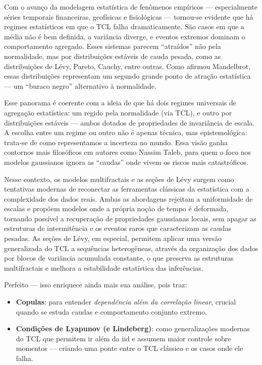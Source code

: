 \documentclass[
]{agujournal2019}
\providecommand{\tightlist}{%
  \setlength{\itemsep}{0pt}\setlength{\parskip}{0pt}}\usepackage{longtable,booktabs,array}
\begin{document}
Com o avanço da modelagem estatística de fenômenos empíricos ---
especialmente séries temporais financeiras, geofísicas e fisiológicas
--- tornou-se evidente que há regimes estatísticos em que o TCL falha
dramaticamente. São casos em que a média não é bem definida, a variância
diverge, e eventos extremos dominam o comportamento agregado. Esses
sistemas parecem ``atraídos'' não pela normalidade, mas por
distribuições estáveis de cauda pesada, como as distribuições de Lévy,
Pareto, Cauchy, entre outras. Como afirmou Mandelbrot, essas
distribuições representam um segundo grande ponto de atração estatística
--- um ``buraco negro'' alternativo à normalidade.

Esse panorama é coerente com a ideia de que há dois regimes universais
de agregação estatística: um regido pela normalidade (via TCL), e outro
por distribuições estáveis --- ambos dotados de propriedades de
invariância de escala. A escolha entre um regime ou outro não é apenas
técnica, mas epistemológica: trata-se de como representamos a incerteza
no mundo. Essa visão ganha contornos mais filosóficos em autores como
Nassim Taleb, para quem o foco nos modelos gaussianos ignora as
``caudas'' onde vivem os riscos mais catastróficos.

Nesse contexto, os modelos multifractais e as seções de Lévy surgem como
tentativas modernas de reconectar as ferramentas clássicas da
estatística com a complexidade dos dados reais. Ambas as abordagens
rejeitam a uniformidade de escalas e propõem modelos onde a própria
noção de tempo é deformada, tornando possível a recuperação de
propriedades gaussianas locais, sem apagar as estruturas de
intermitência e os eventos raros que caracterizam as caudas pesadas. As
seções de Lévy, em especial, permitem aplicar uma versão generalizada do
TCL a sequências heterogêneas, através da organização dos dados por
blocos de variância acumulada constante, o que preserva as estruturas
multifractais e melhora a estabilidade estatística das inferências.

Perfeito --- isso enriquece ainda mais sua análise, pois traz:

\begin{itemize}
\tightlist
\item
  \textbf{Copulas}: para entender \emph{dependência além da correlação
  linear}, crucial quando se estuda caudas e comportamento conjunto
  extremo.
\item
  \textbf{Condições de Lyapunov (e Lindeberg)}: como generalizações
  modernas do TCL que permitem ir além da iid e assumem maior controle
  sobre momentos --- criando uma ponte entre o TCL clássico e os casos
  onde ele falha.
\end{itemize}
\end{document}
